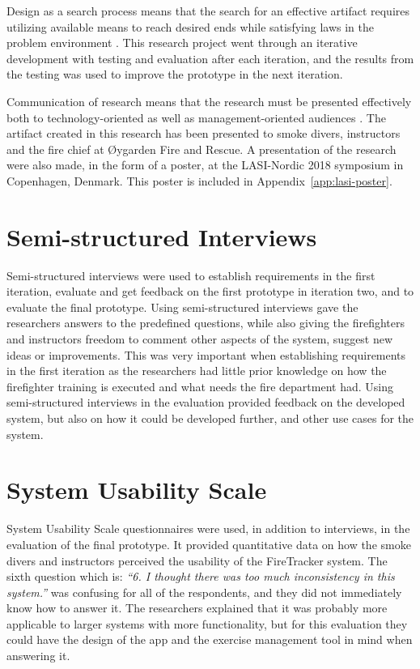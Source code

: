 \documentclass[../Main/thesis.tex]{subfiles}
\begin{document}
Design as a search process means that the search for an effective artifact requires utilizing available means to reach desired ends while satisfying laws in the problem environment \citep{hevner2004design}. 
This research project went through an iterative development with testing and evaluation after each iteration, and the results from the testing was used to improve the prototype in the next iteration.

Communication of research means that the research must be presented effectively both to technology-oriented as well as management-oriented audiences \citep{hevner2004design}. 
The artifact created in this research has been presented to smoke divers, instructors and the fire chief at Øygarden Fire and Rescue.
A presentation of the research were also made, in the form of a poster, at the LASI-Nordic 2018 symposium in Copenhagen, Denmark.
This poster is included in Appendix~\ref{app:lasi-poster}.

\section{Semi-structured Interviews}
Semi-structured interviews were used to establish requirements in the first iteration, evaluate and get feedback on the first prototype in iteration two, and to evaluate the final prototype.
Using semi-structured interviews gave the researchers answers to the predefined questions, while also giving the firefighters and instructors freedom to comment other aspects of the system, suggest new ideas or improvements.
This was very important when establishing requirements in the first iteration as the researchers had little prior knowledge on how the firefighter training is executed and what needs the fire department had.
Using semi-structured interviews in the evaluation provided feedback on the developed system, but also on how it could be developed further, and other use cases for the system.

\section{System Usability Scale}
System Usability Scale questionnaires were used, in addition to interviews, in the evaluation of the final prototype.
It provided quantitative data on how the smoke divers and instructors perceived the usability of the FireTracker system.
The sixth question which is: \textit{``6. I thought there was too much inconsistency in this system.''} was confusing for all of the respondents, and they did not immediately know how to answer it.
The researchers explained that it was probably more applicable to larger systems with more functionality, but for this evaluation they could have the design of the app and the exercise management tool in mind when answering it.
\end{document}
